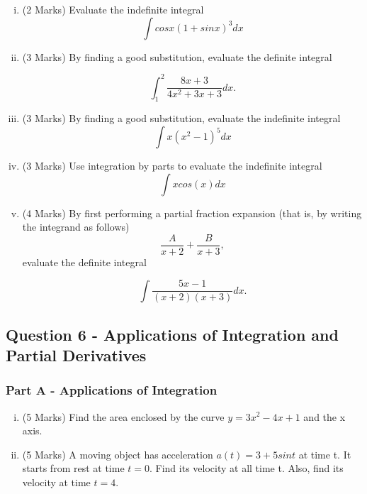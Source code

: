 \documentclass[a4paper,12pt]{article}
\begin{document}

\begin{enumerate}[(i)]
	\item (2 Marks)  Evaluate the indefinite integral
	 \[ \int cos x(1 + sin x)^3 dx \]
	\item (3 Marks) By finding a good substitution, evaluate the definite integral

  \[ \int^2_1 \frac{8x + 3}{4x^2 + 3x + 3} dx.\]
	
	\item (3 Marks) By finding a good substitution, evaluate the indefinite integral
	 \[ \int x(x^2 - 1)^5 dx\]
	\item (3 Marks) Use integration by parts to evaluate the indefinite integral
	\[\int x cos(x) dx\]
	\item (4 Marks) By first performing a partial fraction expansion (that is, by writing the integrand
	as follows)
	\[  \frac{A}{x + 2} + \frac{B}{x + 3},
	\]evaluate the definite integral

	\[ \int \frac{5x-1}{(x + 2)(x + 3)}  dx. \]

\end{enumerate}

\newpage
\subsection*{Question 6  - Applications of Integration and Partial Derivatives}

\subsubsection*{Part A - Applications of Integration}
\begin{enumerate}[(i)]
\item (5 Marks) Find the area enclosed by the curve $y = 3x^2 − 4x + 1$ and the x axis.
\item (5 Marks) A moving object has acceleration
$a(t) = 3 + 5 sin t$ at time t. It starts from rest at time $t = 0$. Find its velocity at all time t.
Also, find its velocity at time $t = 4$.
\end{enumerate}
\end{document}
